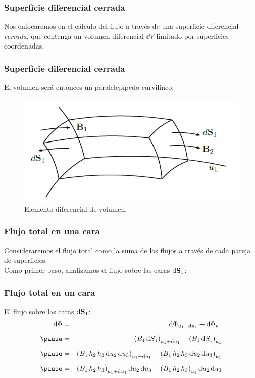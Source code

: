 \documentclass[12pt]{beamer}
\begin{document}
\begin{frame}
\frametitle{Superficie diferencial cerrada}
Nos enfocaremos en el cálculo del flujo a través de una superficie diferencial \emph{cerrada}, que contenga un volumen diferencial $\dd{V}$ limitado por superficies coordenadas.
\end{frame}
\begin{frame}
\frametitle{Superficie diferencial cerrada}
El volumen será entonces un paralelepípedo curvilineo:
\begin{figure}[h!]
    \centering
    \includegraphics[scale=0.5]{Imagenes/Diferencial_Volumen.png}
    \caption{Elemento diferencial de volumen.}
    \label{fig:Diferencial_Volumen}
\end{figure}
\end{frame}
\begin{frame}
\frametitle{Flujo total en una cara}
Consideraremos el flujo total como la suma de los flujos a través de cada pareja de superficies.
\\
\bigskip
Como primer paso, analizamos el flujo sobre las caras $\dd{\vb{S}_{1}}$:
\end{frame}
\begin{frame}
\frametitle{Flujo total en un cara}
El flujo sobre las caras $\dd{\vb{S}_{1}}$:
\begin{eqnarray*}
\dd{\Phi} &=& \dd{\Phi_{u_{1} + \dd{u_{1}}}} + \dd{\Phi_{u_{1}}} \\[0.5em] \pause
&=& \left( B_{1} \dd{S_{1}} \right)_{u_{1} + \dd{u_{1}}} - \left( B_{1} \dd{S_{1}} \right)_{u_{1}} \\[0.5em] \pause
&=& \left( B_{1} \, h_{2} \, h_{3} \dd{u_{2}} \dd{u_{3}} \right)_{u_{1} + \dd{u_{1}}} - \left( B_{1} \, h_{2} \, h_{3} \dd{u_{2}} \dd{u_{3}} \right)_{u_{1}} \\[0.5em] \pause
&=& \left( B_{1} \, h_{2} \, h_{3} \right)_{u_{1} + \dd{u_{1}}} \dd{u_{2}} \dd{u_{3}} - \left( B_{1} \, h_{2} \, h_{3} \right)_{u_{1}} \dd{u_{2}} \dd{u_{3}}
\end{eqnarray*}
\end{frame} 
\end{document}
